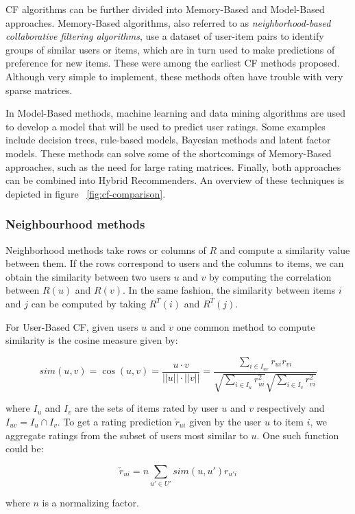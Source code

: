 \documentclass[cic,tc,english]{iiufrgs}
\begin{document}
CF algorithms can be further divided into Memory-Based and Model-Based approaches. Memory-Based algorithms, also referred to as \textit{neighborhood-based collaborative filtering algorithms}, use a dataset of user-item pairs to identify groups of similar users or items, which are in turn used to make predictions of preference for new items. These were among the earliest CF methods proposed. Although very simple to implement, these methods often have trouble with very sparse matrices.

In Model-Based methods, machine learning and data mining algorithms are used to develop a model that will be used to predict user ratings. Some examples include decision trees, rule-based models, Bayesian methods and latent factor models. These methods can solve some of the shortcomings of Memory-Based approaches, such as the need for large rating matrices. Finally, both approaches can be combined into Hybrid Recommenders. An overview of these techniques is depicted in figure ~\ref{fig:cf-comparison}.

\subsubsection{Neighbourhood methods}
Neighborhood methods take rows or columns of $R$ and compute a similarity value between them. If the rows correspond to users and the columns to items, we can obtain the similarity between two users $u$ and $v$ by computing the correlation between $R(u)$ and $R(v)$. In the same fashion, the similarity between items $i$ and $j$ can be computed by taking $R^T(i)$ and $R^T(j)$.

For User-Based CF, given users $u$ and $v$ one common method to compute similarity is the cosine measure given by:

$$sim( u,  v) = \cos( u,  v) = \frac { u \cdot  v}{|| u|| \cdot || v||} = \frac{\sum_{i \in I_{uv}} r_{ui}r_{vi}}{\sqrt{\sum_{i \in I_u} r_{ui}^2}\sqrt{\sum_{i \in I_v} r_{vi}^2}}$$

where $I_u$ and $I_v$ are the sets of items rated by user $u$ and $v$ respectively and $I_{uv} = I_u \cap I_v$. 
To get a rating prediction $\check{r}_{ui}$ given by the user $u$ to item $i$, we aggregate ratings from the subset of users most similar to $u$. One such function could be:

$$
\check{r}_{ui} = n \sum_{u' \in U'} sim(u, u')r_{u'i}
$$

where $n$ is a normalizing factor.
\end{document}
